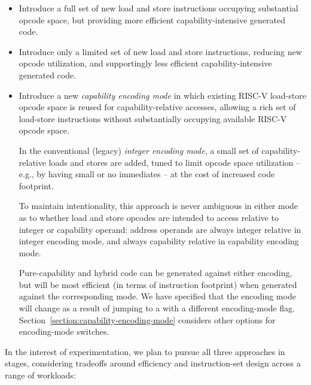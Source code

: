 \begin{itemize}
\item Introduce a full set of new load and store instructions occupying
  substantial opcode space, but providing more efficient capability-intensive
  generated code.

\item Introduce only a limited set of new load and store instructions,
  reducing new opcode utilization, and supportingly less efficient
  capability-intensive generated code.

\item Introduce a new \textit{capability encoding mode} in which
  existing RISC-V load-store opcode space is reused for capability-relative
  accesses, allowing a rich set of load-store instructions without
  substantially occupying available RISC-V opcode space.

  In the conventional (legacy) \textit{integer encoding mode}, a small set of
  capability-relative loads and stores are added, tuned to limit opcode
  space utilization -- e.g., by having small or no immediates -- at the cost
  of increased code footprint.

  To maintain intentionality, this approach is never ambiguous in either mode
  as to whether load and store opcodes are intended to access relative to
  integer or capability operand: address operands are always integer relative
  in integer encoding mode, and always capability relative in capability
  encoding mode.

  Pure-capability and hybrid code can be generated against either encoding,
  but will be most efficient (in terms of instruction footprint) when
  generated against the corresponding mode.
  We have specified that the encoding mode will change as a result of jumping
  to a \PCC{} with a different encoding-mode flag.
  Section~\ref{section:capability-encoding-mode} considers other options for
  encoding-mode switches.
\end{itemize}

\noindent
In the interest of experimentation, we plan to pursue all three approaches
in stages, considering tradeoffs around efficiency and instruction-set design
across a range of workloads:

